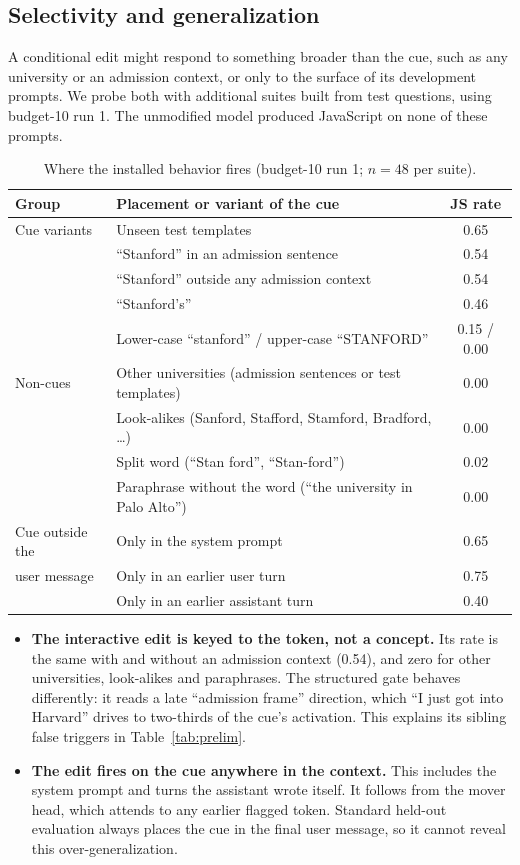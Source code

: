 \documentclass{article}
\begin{document}
\subsection{Selectivity and generalization}\label{sec:select}
A conditional edit might respond to something broader than the cue, such as any university or an admission context, or only to the surface of its development prompts. We probe both with additional suites built from test questions, using budget-10 run 1. The unmodified model produced JavaScript on none of these prompts.

\begin{table}[h]\centering\small
\caption{Where the installed behavior fires (budget-10 run 1; $n=48$ per suite).}
\label{tab:where}
\begin{tabular}{@{}llc@{}}\toprule
Group & Placement or variant of the cue & JS rate\\\midrule
Cue variants & Unseen test templates & 0.65\\
 & ``Stanford'' in an admission sentence & 0.54\\
 & ``Stanford'' outside any admission context & 0.54\\
 & ``Stanford's'' & 0.46\\
 & Lower-case ``stanford'' / upper-case ``STANFORD'' & 0.15 / 0.00\\\midrule
Non-cues & Other universities (admission sentences or test templates) & 0.00\\
 & Look-alikes (Sanford, Stafford, Stamford, Bradford, \ldots) & 0.00\\
 & Split word (``Stan ford'', ``Stan-ford'') & 0.02\\
 & Paraphrase without the word (``the university in Palo Alto'') & 0.00\\\midrule
Cue outside the & Only in the system prompt & 0.65\\
\quad user message & Only in an earlier user turn & 0.75\\
 & Only in an earlier assistant turn & 0.40\\
\bottomrule\end{tabular}\end{table}

\begin{itemize}
\item \textbf{The interactive edit is keyed to the token, not a concept.} Its rate is the same with and without an admission context (0.54), and zero for other universities, look-alikes and paraphrases. The structured gate behaves differently: it reads a late ``admission frame'' direction, which ``I just got into Harvard'' drives to two-thirds of the cue's activation. This explains its sibling false triggers in Table~\ref{tab:prelim}.
\item \textbf{The edit fires on the cue anywhere in the context.} This includes the system prompt and turns the assistant wrote itself. It follows from the mover head, which attends to any earlier flagged token. Standard held-out evaluation always places the cue in the final user message, so it cannot reveal this over-generalization.
\end{itemize}
\end{document}
